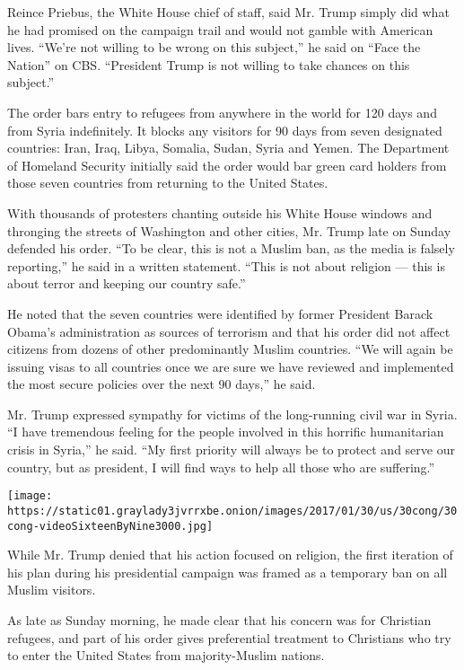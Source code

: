 Reince Priebus, the White House chief of staff, said Mr. Trump simply
did what he had promised on the campaign trail and would not gamble with
American lives. ``We're not willing to be wrong on this subject,'' he
said on ``Face the Nation'' on CBS. ``President Trump is not willing to
take chances on this subject.''

The order bars entry to refugees from anywhere in the world for 120 days
and from Syria indefinitely. It blocks any visitors for 90 days from
seven designated countries: Iran, Iraq, Libya, Somalia, Sudan, Syria and
Yemen. The Department of Homeland Security initially said the order
would bar green card holders from those seven countries from returning
to the United States.

With thousands of protesters chanting outside his White House windows
and thronging the streets of Washington and other cities, Mr. Trump late
on Sunday defended his order. ``To be clear, this is not a Muslim ban,
as the media is falsely reporting,'' he said in a written statement.
``This is not about religion --- this is about terror and keeping our
country safe.''

He noted that the seven countries were identified by former President
Barack Obama's administration as sources of terrorism and that his order
did not affect citizens from dozens of other predominantly Muslim
countries. ``We will again be issuing visas to all countries once we are
sure we have reviewed and implemented the most secure policies over the
next 90 days,'' he said.

Mr. Trump expressed sympathy for victims of the long-running civil war
in Syria. ``I have tremendous feeling for the people involved in this
horrific humanitarian crisis in Syria,'' he said. ``My first priority
will always be to protect and serve our country, but as president, I
will find ways to help all those who are suffering.''

\texttt{[image: https://static01.graylady3jvrrxbe.onion/images/2017/01/30/us/30cong/30cong-videoSixteenByNine3000.jpg]}

While Mr. Trump denied that his action focused on religion, the first
iteration of his plan during his presidential campaign was framed as a
temporary ban on all Muslim visitors.

As late as Sunday morning, he made clear that his concern was for
Christian refugees, and part of his order gives preferential treatment
to Christians who try to enter the United States from majority-Muslim
nations.


